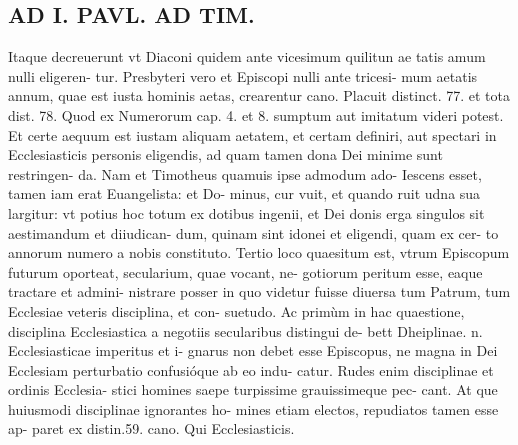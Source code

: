 \documentclass{article}
\begin{document}
\begin{pages}
\section*{AD I. PAVL. AD TIM. }
\marginpar{[ p.148 ]}\pstart Itaque decreuerunt vt Diaconi quidem ante vicesimum quilitun ae tatis amum nulli eligeren- tur.  \pend\pstart Presbyteri vero et Episcopi nulli ante tricesi- mum aetatis annum, quae est iusta hominis aetas, crearentur cano. Placuit distinct. 77. et tota dist. 78. Quod ex Numerorum cap. 4. et 8. sumptum aut imitatum videri potest. Et certe aequum est iustam aliquam aetatem, et certam definiri, aut spectari in Ecclesiasticis personis eligendis, ad quam tamen dona Dei minime sunt restringen- da. Nam et Timotheus quamuis ipse admodum ado- Iescens esset, tamen iam erat Euangelista: et Do- minus, cur vuit, et quando ruit udna sua largitur: vt potius hoc totum ex dotibus ingenii, et Dei donis erga singulos sit aestimandum et diiudican- dum, quinam sint idonei et eligendi, quam ex cer- to annorum numero a nobis constituto.  \pend\pstart Tertio loco quaesitum est, vtrum Episcopum futurum oporteat, secularium, quae vocant, ne- gotiorum peritum esse, eaque tractare et admini- nistrare posser in quo videtur fuisse diuersa tum Patrum, tum Ecclesiae veteris disciplina, et con- suetudo. Ac primùm in hac quaestione, disciplina Ecclesiastica a negotiis secularibus distingui de- bett Dheiplinae. n. Ecclesiasticae imperitus et i- gnarus non debet esse Episcopus, ne magna in Dei Ecclesiam perturbatio confusióque ab eo indu- catur. Rudes enim disciplinae et ordinis Ecclesia- stici homines saepe turpissime grauissimeque pec- cant. At que huiusmodi disciplinae ignorantes ho- mines etiam electos, repudiatos tamen esse ap- paret ex distin.59. cano. Qui Ecclesiasticis.  \pend

\end{pages}
\end{document}
